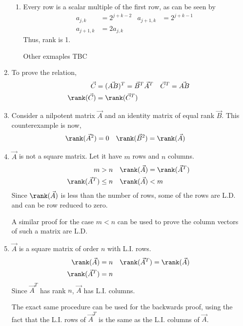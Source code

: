 \begin{enumerate}
\begin{enumerate}
    \item Every row is a scalar multiple of the first row, as can be seen by
          \begin{align}
              a_{j,k}    & = 2^{j+k-2} & a_{j+1, k} & = 2^{j+k-1} \\
              a_{j+1, k} & = 2a_{j,k}
          \end{align}
          Thus, rank is 1. \par
          Other exmaples TBC
\end{enumerate}

\item To prove the relation,
\begin{align}
    \vec{C}        & = (\vec{AB})^T = \vec{B}^T\vec{A}^T &
    \vec{C}^T      & = \vec{AB}                            \\
    \rank(\vec{C}) & = \rank(\vec{C}^T)
\end{align}

\item Consider a nilpotent matrix $ \vec{A} $ and an identity matrix of equal
rank $ \vec{B} $. This counterexample is now,
\begin{align}
    \rank(\vec{A}^2) & = 0              &
    \rank(\vec{B}^2) & = \rank(\vec{A})
\end{align}

\item $\vec{A}$ is not a square matrix. Let it have $ m $ rows and $ n $ columns.
\begin{align}
    m                & > n    & \rank(\vec{A}) & = \rank(\vec{A}^T) \\
    \rank(\vec{A}^T) & \leq n & \rank(\vec{A}) & < m
\end{align}
Since $ \rank(\vec{A}) $ is less than the number of rows, some of the rows are
L.D. and can be row reduced to zero. \par
A similar proof for the case $ m < n $ can be used to prove the column vectors
of such a matrix are L.D.

\item $\vec{A}$ is a square matrix of order $ n $ with L.I. rows.
\begin{align}
    \rank(\vec{A})   & = n & \rank(\vec{A}^T) & = \rank(\vec{A}) \\
    \rank(\vec{A}^T) & = n
\end{align}
Since $ \vec{A}^T $ has rank $ n $, $ \vec{A} $ has L.I. columns. \par
The exact same procedure can be used for the backwards proof, using the fact
that the L.I. rows of $ \vec{A}^T $ is the same as the L.I. columns of
$ \vec{A} $.


\end{enumerate}
